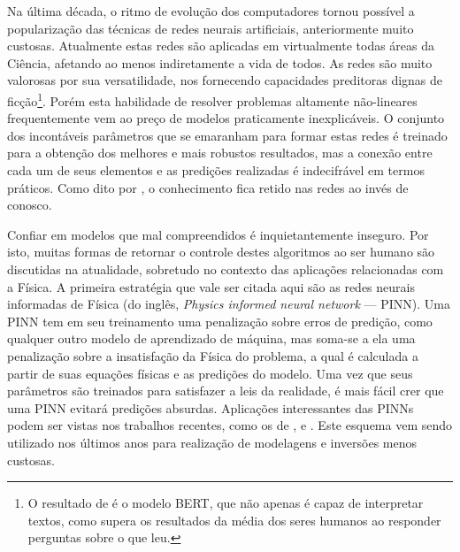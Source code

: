  
 
  Na última década, o ritmo de evolução dos computadores tornou possível a popularização das técnicas de redes neurais artificiais, anteriormente muito custosas. Atualmente estas redes são aplicadas em virtualmente todas áreas da Ciência, afetando ao menos indiretamente a vida de todos. As redes são muito valorosas por sua versatilidade, nos fornecendo capacidades preditoras dignas de ficção\footnote{O resultado de  é o modelo BERT, que não apenas é capaz de interpretar textos, como supera os resultados da média dos seres humanos ao responder perguntas sobre o que leu.}. Porém esta habilidade de resolver problemas altamente não-lineares frequentemente vem ao preço de modelos praticamente inexplicáveis. O conjunto dos incontáveis parâmetros que se emaranham para formar estas redes é treinado para a obtenção dos melhores e mais robustos resultados, mas a conexão entre cada um de seus elementos e as predições realizadas é indecifrável em termos práticos. Como dito por , o conhecimento fica retido nas redes ao invés de conosco.

  Confiar em modelos que mal compreendidos é inquietantemente inseguro. Por isto, muitas formas de retornar o controle destes algoritmos ao ser humano são discutidas na atualidade, sobretudo no contexto das aplicações relacionadas com a Física. A primeira estratégia que vale ser citada aqui são as redes neurais informadas de Física (do inglês, \textit{Physics informed neural network} --- PINN). Uma PINN tem em seu treinamento uma penalização sobre erros de predição, como qualquer outro modelo de aprendizado de máquina, mas soma-se a ela uma penalização sobre a insatisfação da Física do problema, a qual é calculada a partir de suas equações físicas e as predições do modelo. Uma vez que seus parâmetros são treinados para satisfazer a leis da realidade, é mais fácil crer que uma PINN evitará predições absurdas. Aplicações interessantes das PINNs podem ser vistas nos trabalhos recentes, como os de ,  e . Este esquema vem sendo utilizado nos últimos anos para realização de modelagens e inversões menos custosas.

